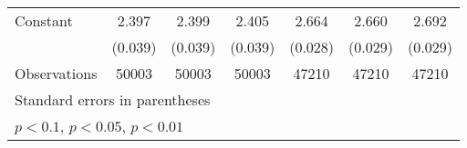 {\begin{tabular}{l*{6}{c}}
Constant            &       2.397\sym{***}&       2.399\sym{***}&       2.405\sym{***}&       2.664\sym{***}&       2.660\sym{***}&       2.692\sym{***}\\
                    &     (0.039)         &     (0.039)         &     (0.039)         &     (0.028)         &     (0.029)         &     (0.029)         \\
\hline
Observations        &       50003         &       50003         &       50003         &       47210         &       47210         &       47210         \\
\hline\hline
\multicolumn{7}{l}{\footnotesize Standard errors in parentheses}\\
\multicolumn{7}{l}{\footnotesize \sym{*} \(p<0.1\), \sym{**} \(p<0.05\), \sym{***} \(p<0.01\)}\\
\end{tabular}
}
